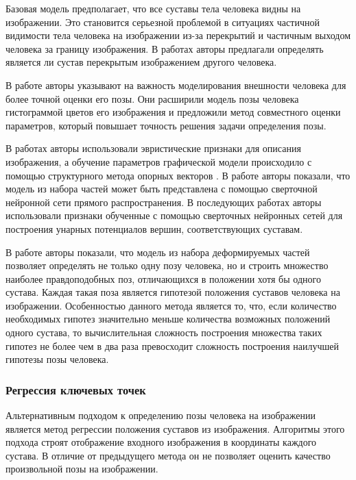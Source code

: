 Базовая модель предполагает, что все суставы тела человека видны на изображении. Это становится серьезной проблемой в ситуациях частичной видимости тела человека на изображении из-за перекрытий и частичным выходом человека за границу изображения. В работах \cite{ghiasi2014parsing,chen2015parsing} авторы предлагали определять является ли сустав перекрытым изображением другого человека.

В работе \cite{chou2013modeling} авторы указывают на важность моделирования внешности человека для более точной оценки его позы. Они расширили модель позы человека гистограммой цветов его изображения и предложили метод совместного оценки параметров, который повышает точность решения задачи определения позы.

В работах \cite{yang2011articulated,pirsiavash2012steerable,ghiasi2014parsing,pishchulin2013poselet} авторы использовали эвристические признаки для описания изображения, а обучение параметров графической модели происходило с помощью структурного метода опорных векторов \cite{finley2008training}. В работе \cite{girshick2015deformable} авторы показали, что модель из набора частей может быть представлена с помощью сверточной нейронной сети прямого распространения. В последующих работах \cite{chen2014articulated,tompson2014joint,chen2015parsing} авторы использовали признаки обученные с помощью сверточных нейронных сетей для построения унарных потенциалов вершин, соответствующих суставам.

В работе \cite{park2011n} авторы показали, что модель из набора деформируемых частей позволяет определять не только одну позу человека, но и строить множество наиболее правдоподобных поз, отличающихся в положении хотя бы одного сустава. Каждая такая поза является гипотезой положения суставов человека на изображении. Особенностью данного метода является то, что, если количество необходимых гипотез значительно меньше количества возможных положений одного сустава, то вычислительная сложность построения множества таких гипотез не более чем в два раза превосходит сложность построения наилучшей гипотезы позы человека.

\subsubsection{Регрессия ключевых точек}

 Альтернативным подходом к определению позы человека на изображении является метод регрессии положения суставов из изображения. Алгоритмы этого подхода строят отображение входного изображения в координаты каждого сустава. В отличие от предыдущего метода он не позволяет оценить качество произвольной позы на изображении.
 
